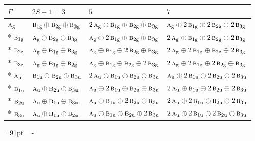 \documentclass[10pt,a4paper]{article}
\newcommand{\needspace}[1]{\par\penalty-100\begingroup\dimen0=#1\relax\dimen2=\pagegoal
  \advance\dimen2-\pagetotal\ifdim\dimen0>\dimen2\relax\ifdim\dimen2>0pt\vfil\break\fi\fi
  \endgroup}
\numberwithin{equation}{section}
\newcommand{\irr}[1]{\text{\normalfont\scshape #1}}
\newcommand{\ptag}[1]{\mathrm{#1}}
\begin{document}
{\small\setlength{\tabcolsep}{3pt}\begin{longtable}{@{}llll@{}}\toprule
$\Gamma$ & $2S + 1 = 3$ & $5$ & $7$\\\midrule\endhead
\bottomrule\endfoot\endlastfoot
$\irr{a}_{\ptag{g}}$ & $\irr{b}_{1\ptag{g}}\oplus \irr{b}_{2\ptag{g}}\oplus \irr{b}_{3\ptag{g}}$ & $2\,\irr{a}_{\ptag{g}}\oplus \irr{b}_{1\ptag{g}}\oplus \irr{b}_{2\ptag{g}}\oplus \irr{b}_{3\ptag{g}}$ & $\irr{a}_{\ptag{g}}\oplus 2\,\irr{b}_{1\ptag{g}}\oplus 2\,\irr{b}_{2\ptag{g}}\oplus 2\,\irr{b}_{3\ptag{g}}$\\*
$\irr{b}_{1\ptag{g}}$ & $\irr{a}_{\ptag{g}}\oplus \irr{b}_{2\ptag{g}}\oplus \irr{b}_{3\ptag{g}}$ & $\irr{a}_{\ptag{g}}\oplus 2\,\irr{b}_{1\ptag{g}}\oplus \irr{b}_{2\ptag{g}}\oplus \irr{b}_{3\ptag{g}}$ & $2\,\irr{a}_{\ptag{g}}\oplus \irr{b}_{1\ptag{g}}\oplus 2\,\irr{b}_{2\ptag{g}}\oplus 2\,\irr{b}_{3\ptag{g}}$\\*
$\irr{b}_{2\ptag{g}}$ & $\irr{a}_{\ptag{g}}\oplus \irr{b}_{1\ptag{g}}\oplus \irr{b}_{3\ptag{g}}$ & $\irr{a}_{\ptag{g}}\oplus \irr{b}_{1\ptag{g}}\oplus 2\,\irr{b}_{2\ptag{g}}\oplus \irr{b}_{3\ptag{g}}$ & $2\,\irr{a}_{\ptag{g}}\oplus 2\,\irr{b}_{1\ptag{g}}\oplus \irr{b}_{2\ptag{g}}\oplus 2\,\irr{b}_{3\ptag{g}}$\\*
$\irr{b}_{3\ptag{g}}$ & $\irr{a}_{\ptag{g}}\oplus \irr{b}_{1\ptag{g}}\oplus \irr{b}_{2\ptag{g}}$ & $\irr{a}_{\ptag{g}}\oplus \irr{b}_{1\ptag{g}}\oplus \irr{b}_{2\ptag{g}}\oplus 2\,\irr{b}_{3\ptag{g}}$ & $2\,\irr{a}_{\ptag{g}}\oplus 2\,\irr{b}_{1\ptag{g}}\oplus 2\,\irr{b}_{2\ptag{g}}\oplus \irr{b}_{3\ptag{g}}$\\*
$\irr{a}_{\ptag{u}}$ & $\irr{b}_{1\ptag{u}}\oplus \irr{b}_{2\ptag{u}}\oplus \irr{b}_{3\ptag{u}}$ & $2\,\irr{a}_{\ptag{u}}\oplus \irr{b}_{1\ptag{u}}\oplus \irr{b}_{2\ptag{u}}\oplus \irr{b}_{3\ptag{u}}$ & $\irr{a}_{\ptag{u}}\oplus 2\,\irr{b}_{1\ptag{u}}\oplus 2\,\irr{b}_{2\ptag{u}}\oplus 2\,\irr{b}_{3\ptag{u}}$\\*
$\irr{b}_{1\ptag{u}}$ & $\irr{a}_{\ptag{u}}\oplus \irr{b}_{2\ptag{u}}\oplus \irr{b}_{3\ptag{u}}$ & $\irr{a}_{\ptag{u}}\oplus 2\,\irr{b}_{1\ptag{u}}\oplus \irr{b}_{2\ptag{u}}\oplus \irr{b}_{3\ptag{u}}$ & $2\,\irr{a}_{\ptag{u}}\oplus \irr{b}_{1\ptag{u}}\oplus 2\,\irr{b}_{2\ptag{u}}\oplus 2\,\irr{b}_{3\ptag{u}}$\\*
$\irr{b}_{2\ptag{u}}$ & $\irr{a}_{\ptag{u}}\oplus \irr{b}_{1\ptag{u}}\oplus \irr{b}_{3\ptag{u}}$ & $\irr{a}_{\ptag{u}}\oplus \irr{b}_{1\ptag{u}}\oplus 2\,\irr{b}_{2\ptag{u}}\oplus \irr{b}_{3\ptag{u}}$ & $2\,\irr{a}_{\ptag{u}}\oplus 2\,\irr{b}_{1\ptag{u}}\oplus \irr{b}_{2\ptag{u}}\oplus 2\,\irr{b}_{3\ptag{u}}$\\*
$\irr{b}_{3\ptag{u}}$ & $\irr{a}_{\ptag{u}}\oplus \irr{b}_{1\ptag{u}}\oplus \irr{b}_{2\ptag{u}}$ & $\irr{a}_{\ptag{u}}\oplus \irr{b}_{1\ptag{u}}\oplus \irr{b}_{2\ptag{u}}\oplus 2\,\irr{b}_{3\ptag{u}}$ & $2\,\irr{a}_{\ptag{u}}\oplus 2\,\irr{b}_{1\ptag{u}}\oplus 2\,\irr{b}_{2\ptag{u}}\oplus \irr{b}_{3\ptag{u}}$\\
\bottomrule\end{longtable}}
\needspace{91pt}
\end{document}
